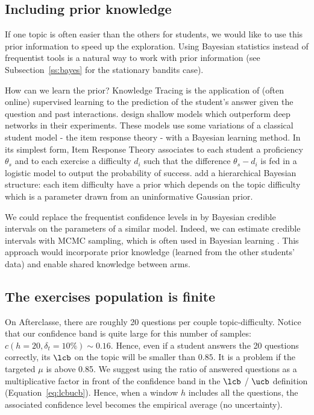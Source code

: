 \subsection{Including prior knowledge}
If one topic is often easier than the others for students, we would like to use this prior information to speed up the exploration. Using Bayesian statistics instead of frequentist tools is a natural way to work with prior information (see Subsection~\ref{ss:bayes} for the stationary bandits case).

How can we learn the prior? Knowledge Tracing \citep{desmarais2012review} is the application of (often online) supervised learning to the prediction of the student's answer given the question and past interactions. \citet{wilson2016back}  design shallow models which outperform deep networks \citep{piech2015deep, khajah2016how, xiong2016going} in their experiments. These models use some variations of a classical student model - the item response theory - with a Bayesian learning method. In its simplest form, Item Response Theory \citep{hambleton2013item} associates to each student a proficiency $\theta_s$ and to each exercise a difficulty $d_i$ such that the difference $\theta_s - d_i$ is fed in a logistic model to output the probability of success. \citet{wilson2016back} add a hierarchical Bayesian structure: each item difficulty have a prior which depends on the topic difficulty which is a parameter drawn from an uninformative Gaussian prior.

We could replace the frequentist confidence levels in \FLUTE by Bayesian credible intervals on the parameters of a similar model. Indeed, we can estimate credible intervals with MCMC sampling, which is often used in Bayesian learning \citep{andrieu2003introduction}. This approach would incorporate prior knowledge (learned from the other students' data) and enable shared knowledge between arms.


\subsection{The exercises population is finite}
On Afterclasse, there are roughly 20 questions per couple topic-difficulty. Notice that our confidence band is quite large for this number of samples: $c(h=20,\delta_t = 10\%)\sim 0.16$. Hence, even if a student answers the 20 questions correctly, its $\lcb$ on the topic will be smaller than $0.85$. It is a problem if the targeted $\mu$ is above 0.85. We suggest using the ratio of answered questions as a multiplicative factor in front of the confidence band in the $\lcb$ / $\ucb$ definition (Equation~\ref{eq:lcbucb}). Hence, when a window $h$ includes all the questions, the associated confidence level becomes the empirical average (no uncertainty). 

